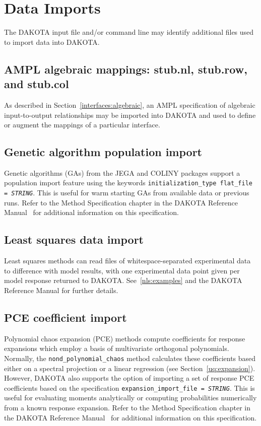 \section{Data Imports}\label{input:import}

The DAKOTA input file and/or command line may identify additional
files used to import data into DAKOTA.

\subsection{AMPL algebraic mappings: stub.nl, stub.row, and stub.col}

As described in Section~\ref{interfaces:algebraic}, an AMPL
specification of algebraic input-to-output relationships may be
imported into DAKOTA and used to define or augment the mappings of a
particular interface.

\subsection{Genetic algorithm population import}

Genetic algorithms (GAs) from the JEGA and COLINY packages support a 
population import feature using the keywords 
\texttt{initialization\_type flat\_file = \emph{STRING}}.  This is 
useful for warm starting GAs from available data or previous runs.
Refer to the Method Specification chapter in the DAKOTA Reference
Manual~\cite{RefMan} for additional information on this specification.

\subsection{Least squares data import}

Least squares methods can read files of whitespace-separated
experimental data to difference with model results, with one
experimental data point given per model response returned to DAKOTA.
See~\ref{nls:examples} and the DAKOTA Reference Manual for further
details.

\subsection{PCE coefficient import}

Polynomial chaos expansion (PCE) methods compute coefficients for
response expansions which employ a basis of multivariate orthogonal
polynomials.  Normally, the \texttt{nond\_polynomial\_chaos} method
calculates these coefficients based either on a spectral projection or
a linear regression (see Section~\ref{uq:expansion}).  However,
DAKOTA also supports the option of importing a set of response PCE
coefficients based on the specification
\texttt{expansion\_import\_file = \emph{STRING}}.  This is useful for
evaluating moments analytically or computing probabilities numerically
from a known response expansion.  Refer to the Method Specification
chapter in the DAKOTA Reference Manual~\cite{RefMan} for additional
information on this specification.

